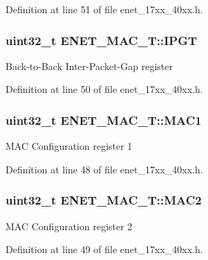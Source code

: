 Definition at line 51 of file enet\+\_\+17xx\+\_\+40xx.\+h.

\subsubsection[{\texorpdfstring{I\+P\+GT}{IPGT}}]{ uint32\+\_\+t E\+N\+E\+T\+\_\+\+M\+A\+C\+\_\+\+T\+::\+I\+P\+GT}\hypertarget{structENET__MAC__T_ac73d8d2cf290a3b9dc117340fc093d7e}{}\label{structENET__MAC__T_ac73d8d2cf290a3b9dc117340fc093d7e}
Back-\/to-\/\+Back Inter-\/\+Packet-\/\+Gap register 

Definition at line 50 of file enet\+\_\+17xx\+\_\+40xx.\+h.

\subsubsection[{\texorpdfstring{M\+A\+C1}{MAC1}}]{ uint32\+\_\+t E\+N\+E\+T\+\_\+\+M\+A\+C\+\_\+\+T\+::\+M\+A\+C1}\hypertarget{structENET__MAC__T_a1e758365774fda3ac9c11922c4a7ef35}{}\label{structENET__MAC__T_a1e758365774fda3ac9c11922c4a7ef35}
M\+AC Configuration register 1 

Definition at line 48 of file enet\+\_\+17xx\+\_\+40xx.\+h.

\subsubsection[{\texorpdfstring{M\+A\+C2}{MAC2}}]{ uint32\+\_\+t E\+N\+E\+T\+\_\+\+M\+A\+C\+\_\+\+T\+::\+M\+A\+C2}\hypertarget{structENET__MAC__T_a925a92dbe2a48105e6497378a8cdfcac}{}\label{structENET__MAC__T_a925a92dbe2a48105e6497378a8cdfcac}
M\+AC Configuration register 2 

Definition at line 49 of file enet\+\_\+17xx\+\_\+40xx.\+h.

